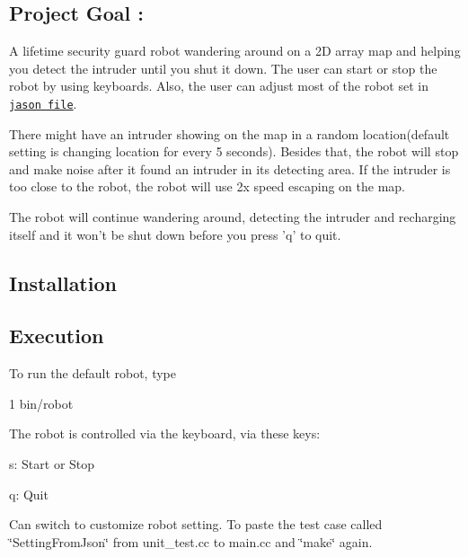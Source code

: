 \subsection*{Project Goal \+: }

A lifetime security guard robot wandering around on a 2\+D array map and helping you detect the intruder until you shut it down. The user can start or stop the robot by using keyboards. Also, the user can adjust most of the robot set in \href{robot_setting.json}{\tt jason file}.

There might have an intruder showing on the map in a random location(default setting is changing location for every 5 seconds). Besides that, the robot will stop and make noise after it found an intruder in its detecting area. If the intruder is too close to the robot, the robot will use 2x speed escaping on the map.

The robot will continue wandering around, detecting the intruder and recharging itself and it won't be shut down before you press 'q' to quit.

\subsection*{Installation }




\subsection*{Execution }

To run the default robot, type 
\begin{DoxyCode}
1 bin/robot
\end{DoxyCode}
 The robot is controlled via the keyboard, via these keys\+:


\begin{DoxyItemize}
\item s\+: Start or Stop
\item q\+: Quit
\end{DoxyItemize}

Can switch to customize robot setting. To paste the test case called \char`\"{}\+Setting\+From\+Json\char`\"{} from unit\+\_\+test.\+cc to main.\+cc and \char`\"{}make\char`\"{} again.

